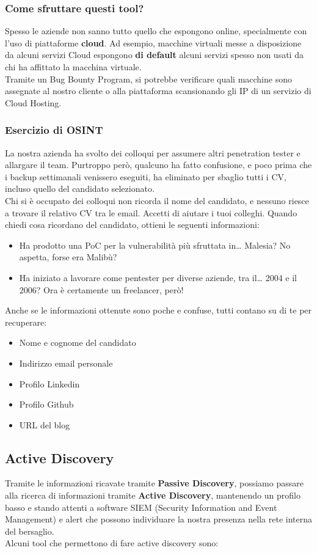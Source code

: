 \documentclass{article}
\begin{document}
\subsubsection{Come sfruttare questi tool?}
Spesso le aziende non sanno tutto quello che espongono online, specialmente con l'uso di piattaforme \textbf{cloud}. Ad esempio, macchine virtuali messe a disposizione da alcuni servizi Cloud espongono \textbf{di default} alcuni servizi spesso non usati da chi ha affittato la macchina virtuale.\\
Tramite un Bug Bounty Program, si potrebbe verificare quali macchine sono 
assegnate al nostro cliente o alla piattaforma scansionando gli IP di un servizio di Cloud Hosting.

\subsubsection{Esercizio di OSINT}
La nostra azienda ha svolto dei colloqui per assumere altri penetration tester e allargare il team. Purtroppo però, qualcuno ha fatto confusione, e poco prima che i backup settimanali venissero eseguiti, ha eliminato per sbaglio tutti i CV, incluso quello del candidato selezionato.\\
Chi si è occupato dei colloqui non ricorda il nome del candidato, e nessuno riesce a trovare il relativo CV tra le email. Accetti di aiutare i tuoi colleghi. Quando chiedi cosa ricordano del candidato, ottieni le seguenti informazioni:
\begin{itemize}
    \item Ha prodotto una PoC per la vulnerabilità più sfruttata in… Malesia? No aspetta, forse era Malibù?
    \item Ha iniziato a lavorare come pentester per diverse aziende, tra il… 2004 e il 2006? Ora è certamente un freelancer, però!
\end{itemize}
Anche se le informazioni ottenute sono poche e confuse, tutti contano su di te per recuperare:
\begin{itemize}
    \item Nome e cognome del candidato
    \item Indirizzo email personale
    \item Profilo Linkedin
    \item Profilo Github
    \item URL del blog
\end{itemize}

\subsection{Active Discovery}
Tramite le informazioni ricavate tramite \textbf{Passive Discovery}, possiamo passare alla ricerca di informazioni tramite \textbf{Active Discovery}, mantenendo un profilo basso e stando attenti a software SIEM (Security Information and Event Management) e alert che possono individuare la nostra presenza nella rete interna del bersaglio.\\
Alcuni tool che permettono di fare active discovery sono:
\newpage
\end{document}
